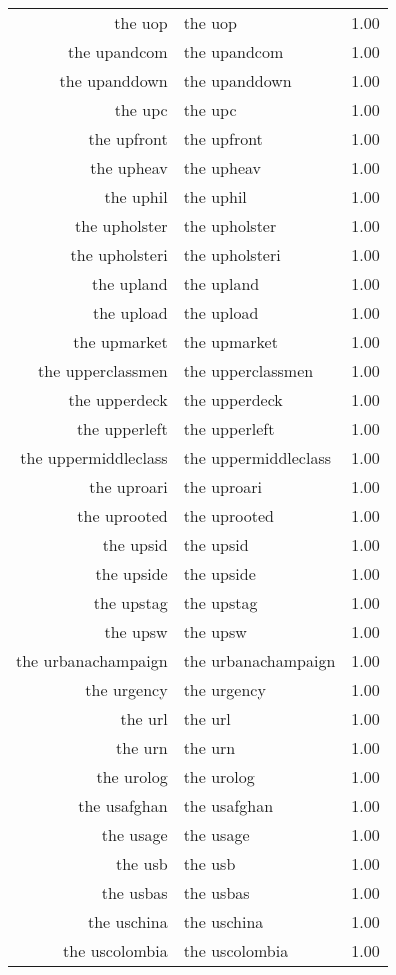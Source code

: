 \begin{table}[ht]
\begin{tabular}{rlr}
  the uop & the uop & 1.00 \\ 
  the upandcom & the upandcom & 1.00 \\ 
  the upanddown & the upanddown & 1.00 \\ 
  the upc & the upc & 1.00 \\ 
  the upfront & the upfront & 1.00 \\ 
  the upheav & the upheav & 1.00 \\ 
  the uphil & the uphil & 1.00 \\ 
  the upholster & the upholster & 1.00 \\ 
  the upholsteri & the upholsteri & 1.00 \\ 
  the upland & the upland & 1.00 \\ 
  the upload & the upload & 1.00 \\ 
  the upmarket & the upmarket & 1.00 \\ 
  the upperclassmen & the upperclassmen & 1.00 \\ 
  the upperdeck & the upperdeck & 1.00 \\ 
  the upperleft & the upperleft & 1.00 \\ 
  the uppermiddleclass & the uppermiddleclass & 1.00 \\ 
  the uproari & the uproari & 1.00 \\ 
  the uprooted & the uprooted & 1.00 \\ 
  the upsid & the upsid & 1.00 \\ 
  the upside & the upside & 1.00 \\ 
  the upstag & the upstag & 1.00 \\ 
  the upsw & the upsw & 1.00 \\ 
  the urbanachampaign & the urbanachampaign & 1.00 \\ 
  the urgency & the urgency & 1.00 \\ 
  the url & the url & 1.00 \\ 
  the urn & the urn & 1.00 \\ 
  the urolog & the urolog & 1.00 \\ 
  the usafghan & the usafghan & 1.00 \\ 
  the usage & the usage & 1.00 \\ 
  the usb & the usb & 1.00 \\ 
  the usbas & the usbas & 1.00 \\ 
  the uschina & the uschina & 1.00 \\ 
  the uscolombia & the uscolombia & 1.00 \\ 

\end{tabular}
\end{table}
